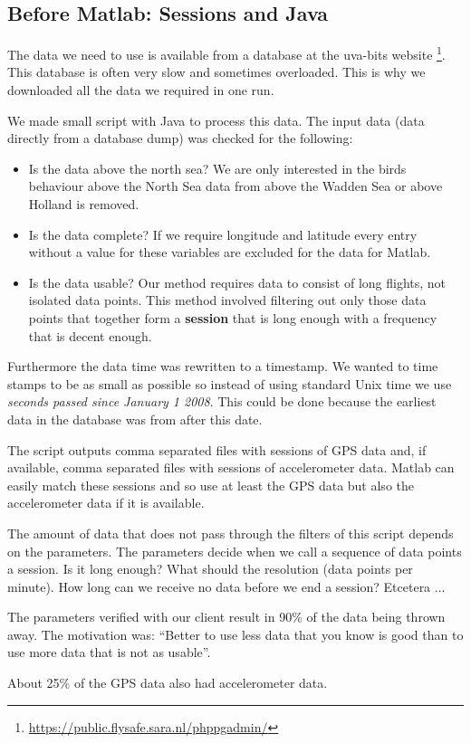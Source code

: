 \subsection{Before Matlab: Sessions and Java}
The data we need to use is available from a database at the uva-bits website
\footnote{\url{https://public.flysafe.sara.nl/phppgadmin/}}. This database is often very slow 
and sometimes overloaded. This is why we downloaded all the data we required in one run. 

We made small script with Java to process this data. The input data (data directly from a 
database dump) was checked for the following: 
\begin{itemize}
    \item Is the data above the north sea? We are only interested in the birds behaviour 
    above the North Sea data from above the Wadden Sea or above Holland is removed.
    \item Is the data complete? If we require longitude and latitude every entry 
    without a value for these variables are excluded for the data for Matlab. 
    \item Is the data usable? Our method requires data to consist of long flights,
    not isolated data points. This method involved filtering out only those data points
    that together form a \textbf{session} that is long enough with a frequency that is
    decent enough. 
\end{itemize}

Furthermore the data time was rewritten to a timestamp. We wanted to time stamps to be 
as small as possible so instead of using standard Unix time we use \textit{seconds passed
since 
January 1 2008}. This could be done because the earliest data in the database was from after
this date. 

The script outputs comma separated files with sessions of GPS data and, if available, comma
separated files with sessions of accelerometer data. Matlab can easily match these sessions
and so use at least the GPS data but also the accelerometer data if it is available. 

The amount of data that does not pass through the filters of this script depends on the 
parameters. The parameters decide when we call a sequence of data points a session. Is
it long enough? What should the resolution (data points per minute). How long can we receive
no data before we end a session? Etcetera ...

The parameters verified with our client result in 90\% of the data being thrown away. 
The motivation was: ``Better to use less data that you know is good than to use more data that 
is not as usable''. 

About 25\% of the GPS data also had accelerometer data.



